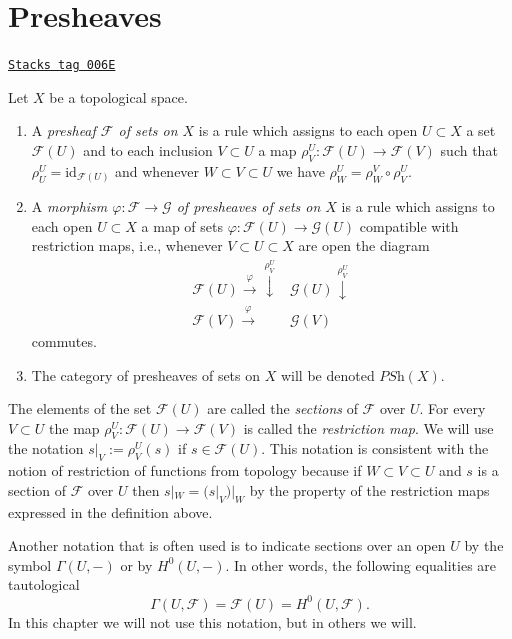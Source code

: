 \section{Presheaves}
\label{sheaves-section-presheaves}
\begin{definition}[Presheaf]
\label{sheaves-definition-presheaf}
\href{https://stacks.math.columbia.edu/tag/006E}{\texttt{Stacks tag 006E}}

Let $X$ be a topological space.
\begin{enumerate}
\item A {\it presheaf $\mathcal{F}$ of sets on $X$} is a rule which
assigns to each open $U \subset X$ a set $\mathcal{F}(U)$ and
to each inclusion $V \subset U$ a map
$\rho^U_V : \mathcal{F}(U) \to \mathcal{F}(V)$ such that
$\rho^U_U = \text{id}_{\mathcal{F}(U)}$ and
whenever $W \subset V \subset U$ we have
$\rho^U_W = \rho^V_W \circ \rho ^U_V$.
\item A {\it morphism $\varphi : \mathcal{F} \to \mathcal{G}$
of presheaves of sets on $X$} is a rule which assigns to each
open $U \subset X$ a map of sets $\varphi : \mathcal{F}(U)
\to \mathcal{G}(U)$ compatible with restriction maps,
i.e., whenever $V \subset U \subset X$ are open the
diagram
$$
\begin{array}{cc}\mathcal{F}(U) \overset{\varphi}{\longrightarrow}\overset{\rho^U_V}{\downarrow} & \mathcal{G}(U) \overset{\rho^U_V}{\downarrow} \\ \mathcal{F}(V) \overset{\varphi}{\longrightarrow} & \mathcal{G}(V)\end{array}
$$
commutes.
\item The category of presheaves of sets on $X$ will be denoted
$\textit{PSh}(X)$.
\end{enumerate}
\end{definition}

The elements of the set $\mathcal{F}(U)$ are called
the {\it sections} of $\mathcal{F}$ over $U$.
For every $V \subset U$ the map
$\rho^U_V : \mathcal{F}(U) \to \mathcal{F}(V)$
is called the {\it restriction map}. We will use the
notation $s|_V := \rho^U_V(s)$ if $s\in \mathcal{F}(U)$.
This notation is consistent with the notion of restriction
of functions from topology because if $W \subset V \subset U$
and $s$ is a section of $\mathcal{F}$ over $U$ then
$s|_W = (s|_V)|_W$ by the property of the restriction maps
expressed in the definition above.

\medskip\noindent
Another notation that is often used is to indicate sections
over an open $U$ by the symbol $\Gamma(U, -)$ or by
$H^0(U, -)$. In other words, the following equalities
are tautological
$$
\Gamma(U, \mathcal{F}) = \mathcal{F}(U) = H^0(U, \mathcal{F}).
$$
In this chapter we will not use this notation, but in others
we will.

